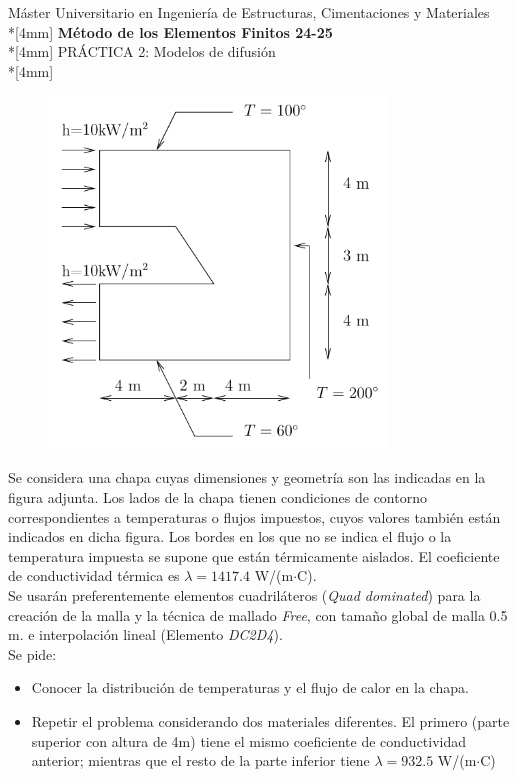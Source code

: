 \documentclass[a4paper,12pt]{article}
\begin{document}
\mbox{}\vspace*{-45mm}

{\centering
{\small\sc 
Máster Universitario en Ingeniería de Estructuras, Cimentaciones y Materiales}\\*[4mm]
{\Large\bf Método de los Elementos Finitos 24-25}\\*[4mm]
PRÁCTICA 2: Modelos de difusión \\*[4mm]
}

\vspace{3mm}



\begin{figure}
\begin{center}
 \vspace{-30pt}
\includegraphics[width=90mm]{practi4}
\end{center}
\end{figure}

Se considera una chapa cuyas dimensiones y geometría son las indicadas
en la figura adjunta. Los lados de la chapa tienen condiciones de contorno 
correspondientes a temperaturas o flujos impuestos, cuyos valores
también están indicados en dicha figura. Los bordes en los que no se indica
el flujo o la temperatura impuesta se supone que están térmicamente aislados.
El coeficiente de conductividad térmica es $\lambda=1417.4$ W/(m$\cdot$C).\\

Se usarán preferentemente elementos cuadriláteros (\emph{Quad dominated}) para la creación de la malla y la técnica de mallado \emph{Free}, con tamaño global de malla 0.5 m. e interpolación lineal (Elemento \emph{DC2D4}).\\


Se pide:
\begin{itemize}
\item Conocer la distribución de temperaturas y el flujo de calor en la chapa.

\item Repetir el problema considerando dos materiales diferentes. El primero (parte superior con altura de 4m) tiene el mismo coeficiente de conductividad anterior; mientras que el resto de la parte inferior tiene $\lambda=932.5$ W/(m$\cdot$C) 
\end{itemize}
\end{document}

